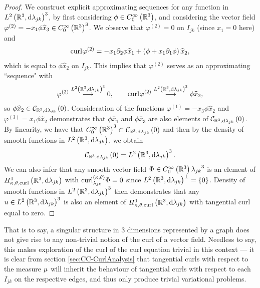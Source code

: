 \begin{proof}
	We construct explicit approximating sequences for any function in $L^{2}\left( \mathbb{R}^3,\mathrm{d} \lambda_{jk} \right)^3$, by first considering $\phi\in C^{\infty}_{0}\left( \mathbb{R}^3 \right)$, and considering the vector field $\varphi^{(2)} = -x_1\phi\widehat{x}_3\in C^{\infty}_{0}\left( \mathbb{R}^3 \right)^3$.
	We observe that $\varphi^{(2)}=0$ on $I_{jk}$ (since $x_1=0$ here) and 
	\begin{align*}
		\mathrm{curl}_{}\varphi^{(2)} = -x_1\partial_2\phi\widehat{x}_1 + \left( \phi + x_1\partial_1\phi \right)\widehat{x}_2,
	\end{align*}
	which is equal to $\phi\widehat{x}_2$ on $I_{jk}$.
	This implies that $\varphi^{(2)}$ serves as an approximating ``sequence" with
	\begin{align*}
		\varphi^{(2)} \overset{L^{2}\left( \mathbb{R}^3,\mathrm{d} \lambda_{jk} \right)^3}{\longrightarrow} 0, 
		\qquad
		\mathrm{curl}_{}\varphi^{(2)} \overset{L^{2}\left( \mathbb{R}^3,\mathrm{d} \lambda_{jk} \right)^3}{\longrightarrow} \phi\widehat{x}_2,
	\end{align*}
	so $\phi\widehat{x}_2\in\mathcal{C}_{ \mathbb{R}^3, \mathrm{d}\lambda_{jk}}\left( 0 \right)$.
	Consideration of the functions $\varphi^{(1)} = -x_3\phi\widehat{x}_2$ and $\varphi^{(3)}=x_1\phi\widehat{x}_2$ demonstrates that $\phi\widehat{x}_1$ and $\phi\widehat{x}_3$ are also elements of $\mathcal{C}_{ \mathbb{R}^3, \mathrm{d}\lambda_{jk}}\left( 0 \right)$.
	By linearity, we have that $C^{\infty}_{0}\left( \mathbb{R}^3 \right)^3\subset\mathcal{C}_{ \mathbb{R}^3, \mathrm{d}\lambda_{jk}}\left( 0 \right)$ and then by the density of smooth functions in $L^{2}\left( \mathbb{R}^3,\mathrm{d} \lambda_{jk} \right)$, we obtain
	\begin{align*}
		\mathcal{C}_{ \mathbb{R}^3, \mathrm{d}\lambda_{jk}}\left( 0 \right) = L^{2}\left( \mathbb{R}^3,\mathrm{d} \lambda_{jk} \right)^3.
	\end{align*}
	We can also infer that any smooth vector field $\Phi\in C^{\infty}_{0}\left( \mathbb{R}^3 \right){\lambda_{jk}}^3$ is an element of $H^1_{\kappa,\theta,\mathrm{curl}}\left( \mathbb{R}^3, \mathrm{d}\lambda_{jk} \right)$ with $\mathrm{curl}_{\lambda_{jk}}^{\left( \kappa, \theta \right)}\Phi = 0$ since $L^{2}\left( \mathbb{R}^3,\mathrm{d} \lambda_{jk} \right)^{\perp} = \left\{ 0 \right\}$.
	Density of smooth functions in $L^{2}\left( \mathbb{R}^3,\mathrm{d} \lambda_{jk} \right)^3$ then demonstrates that any $u\in L^{2}\left( \mathbb{R}^3,\mathrm{d} \lambda_{jk} \right)^3$ is also an element of $H^1_{\kappa,\theta,\mathrm{curl}}\left( \mathbb{R}^3, \mathrm{d}\lambda_{jk} \right)$ with tangential curl equal to zero.
\end{proof}
That is to say, a singular structure in 3 dimensions represented by a graph does not give rise to any non-trivial notion of the curl of a vector field.
Needless to say, this makes exploration of the curl of the curl equation trivial in this context --- it is clear from section \ref{sec:CC-CurlAnalysis} that tangential curls with respect to the measure $\mu$ will inherit the behaviour of tangential curls with respect to each $I_{jk}$ on the respective edges, and thus only produce trivial variational problems.

